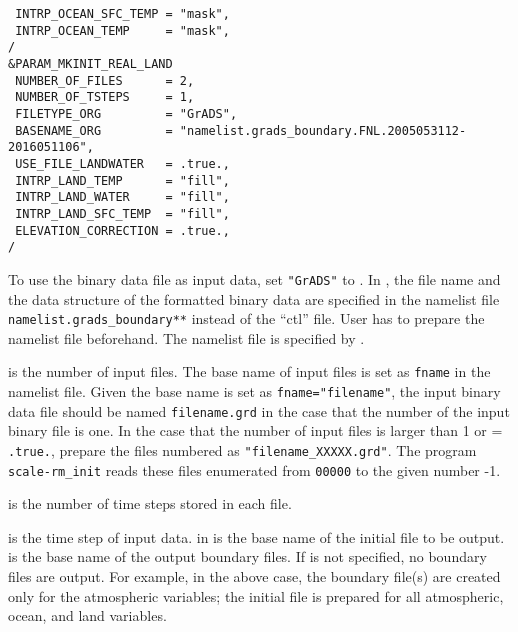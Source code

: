 {\verb| INTRP_OCEAN_SFC_TEMP = "mask",|\\
\verb| INTRP_OCEAN_TEMP     = "mask",|\\
\verb|/|\\
\verb|&PARAM_MKINIT_REAL_LAND|\\
\verb| NUMBER_OF_FILES      = 2,|\\
\verb| NUMBER_OF_TSTEPS     = 1, |\\
\verb| FILETYPE_ORG         = "GrADS",|\\
\verb| BASENAME_ORG         = "namelist.grads_boundary.FNL.2005053112-2016051106",|\\
\verb| USE_FILE_LANDWATER   = .true.,|\\
\verb| INTRP_LAND_TEMP      = "fill",|\\
\verb| INTRP_LAND_WATER     = "fill",|\\
\verb| INTRP_LAND_SFC_TEMP  = "fill",|\\
\verb| ELEVATION_CORRECTION = .true.,|\\
\verb|/|\\
}

To use the binary data file as input data, set \verb|"GrADS"| to .
In \scalerm, the file name and the data structure of the \grads formatted binary data are specified in the namelist file \verb|namelist.grads_boundary**| instead of the ``ctl'' file.
User has to prepare the namelist file beforehand.
The namelist file is specified by .

 is the number of input files.
The base name of input files is set as \verb|fname| in the namelist file.
Given the base name is set as \verb|fname="filename"|, the input binary data file should be named  \verb|filename.grd| in the case that the number of the input binary file is one.
In the case that the number of input files is larger than 1 or  = \verb|.true.|, prepare the files numbered as \verb|"filename_XXXXX.grd"|.
The program \verb|scale-rm_init| reads these files enumerated from \verb|00000| to the given number -1.

 is the number of time steps stored in each file.


 is the time step of input data.
 in  is the base name of the initial file to be output.
 is the base name of the output boundary files.
If  is not specified, no boundary files are output.
For example, in the above case, the boundary file(s) are created only for the atmospheric variables; the initial file is prepared for all atmospheric, ocean, and land variables.

